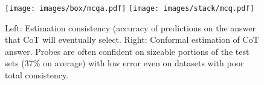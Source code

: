 \begin{figure}[t]
    \centering
    \texttt{[image: images/box/mcqa.pdf]} \texttt{[image: images/stack/mcq.pdf]}
    \caption{Left: Estimation consistency (accuracy of predictions on the answer that CoT  will eventually select. Right: Conformal estimation of CoT answer. Probes are often confident on sizeable portions of the test sets (37\% on average) with low error even on datasets with poor total consistency.}
    \label{fig:mcqaboxstack}
\end{figure}